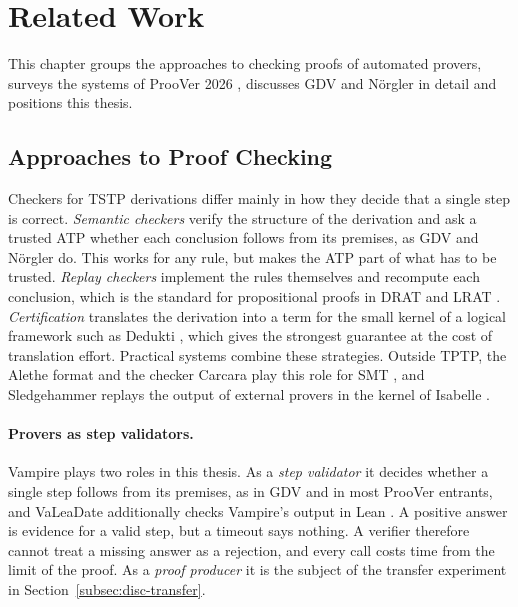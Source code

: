 \section{Related Work}
\label{sec:related-work}

This chapter groups the approaches to checking proofs of automated provers, surveys the systems of ProoVer 2026 \citep{ProoVer2026Proceedings}, discusses GDV \citep{Sutcliffe2006GDV} and N\"orgler \citep{taprogge2026lightweight} in detail and positions this thesis.

\subsection{Approaches to Proof Checking}
\label{subsec:rw-approaches}

Checkers for TSTP derivations differ mainly in how they decide that a single step is correct.
\emph{Semantic checkers} verify the structure of the derivation and ask a trusted ATP whether each conclusion follows from its premises, as GDV \citep{Sutcliffe2006GDV} and N\"orgler \citep{taprogge2026lightweight} do. This works for any rule, but makes the ATP part of what has to be trusted.
\emph{Replay checkers} implement the rules themselves and recompute each conclusion, which is the standard for propositional proofs in DRAT and LRAT \citep{Wetzler2014DRATtrim,CruzFilipe2017LRAT}.
\emph{Certification} translates the derivation into a term for the small kernel of a logical framework such as Dedukti \citep{Assaf2023Dedukti,Delahaye2013ZenonModulo,Sutcliffe2025GDVLP}, which gives the strongest guarantee at the cost of translation effort.
Practical systems combine these strategies.
Outside TPTP, the Alethe format and the checker Carcara play this role for SMT \citep{Schurr2021Alethe,Carcara2023}, and Sledgehammer replays the output of external provers in the kernel of Isabelle \citep{Bohme2010Sledgehammer}.

\paragraph{Provers as step validators.}
\label{subsec:rw-vampire}

Vampire \citep{RiazanovVoronkov2002,KovacsVoronkov2013} plays two roles in this thesis.
As a \emph{step validator} it decides whether a single step follows from its premises, as in GDV and in most ProoVer entrants, and VaLeaDate additionally checks Vampire's output in Lean \citep{LeanOnVampire2026}.
A positive answer is evidence for a valid step, but a timeout says nothing. A verifier therefore cannot treat a missing answer as a rejection, and every call costs time from the limit of the proof.
As a \emph{proof producer} it is the subject of the transfer experiment in Section~\ref{subsec:disc-transfer}.

